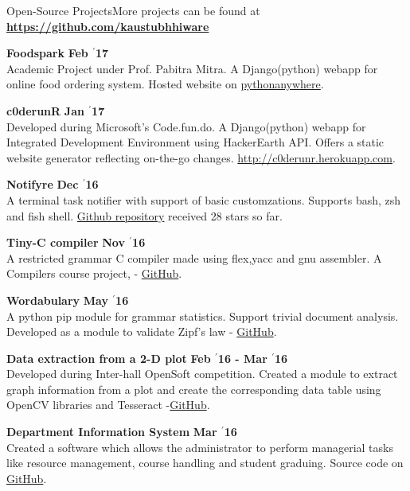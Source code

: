 \documentclass{resume} %
\begin{document}
\begin{rSection}{\large Open-Source Projects}{}{More projects can be found at \textbf{\large \url{https://github.com/kaustubhhiware}}}

{\bf \large Foodspark} \hfill \textbf{Feb $^{\prime}$17} \\ 
Academic Project under Prof. Pabitra Mitra. A Django(python) webapp for online food ordering system. Hosted website on \href{http://foodkgp.pythonanywhere.com}{pythonanywhere}.

{\bf \large c0derunR} \hfill \textbf{Jan $^{\prime}$17} \\ 
Developed during Microsoft's Code.fun.do. A Django(python) webapp for Integrated Development Environment using HackerEarth API. Offers a static website generator reflecting on-the-go changes. \url{http://c0derunr.herokuapp.com}.

{\bf \large Notifyre} \hfill \textbf{Dec $^{\prime}$16} \\ 
A terminal task notifier with support of basic customzations. Supports bash, zsh and fish shell. \href{https://github.com/kaustubhhiware/ NotiFyre}{Github repository} received 28 stars so far.

{\bf \large Tiny-C compiler} \hfill \textbf{Nov $^{\prime}$16} \\ 
A restricted grammar C compiler made using flex,yacc and gnu assembler. A Compilers course project, - \href{https://github.com/kaustubhhiware/cOMPILER}{GitHub}.

{\bf \large Wordabulary} \hfill \textbf{May $^{\prime}$16} \\ 
A python pip module for grammar statistics. Support trivial document analysis. Developed as a module to validate Zipf’s law -  \href{https://github.com/kaustubhhiware/Wordabulary}{GitHub}.

{\bf \large Data extraction from a 2-D plot} \hfill \textbf{Feb $^{\prime}$16 - Mar $^{\prime}$16} \\ 
Developed during Inter-hall OpenSoft competition. Created a module to extract graph information from a plot and create the corresponding data table using OpenCV libraries and Tesseract -\href{https://github.com/Azad-Hall/open-soft-2015-2016}{GitHub}.

{\bf \large Department Information System} \hfill \textbf{Mar $^{\prime}$16} \\ 
Created a software which allows the administrator to perform managerial tasks like resource management, course handling and student graduing. Source code on \href{https://github.com/kaustubhhiware/DepInfosys}{GitHub}.

\end{rSection}
\end{document}
